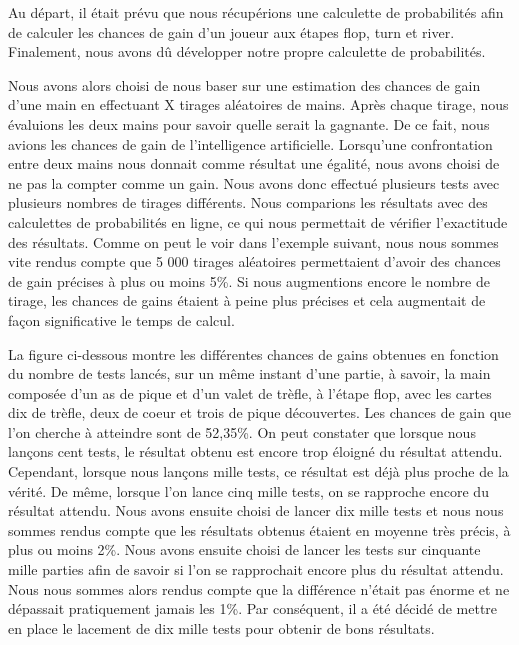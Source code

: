 \documentclass{report}
\begin{document}
Au départ, il était prévu que nous récupérions une calculette de probabilités afin de calculer les chances de gain d'un joueur aux étapes flop, turn et river. Finalement, nous avons dû développer notre propre calculette de probabilités.\par
Nous avons alors choisi de nous baser sur une estimation des chances de gain d'une main en effectuant X tirages aléatoires de mains. Après chaque tirage, nous évaluions les deux mains pour savoir quelle serait la gagnante. De ce fait, nous avions les chances de gain de l'intelligence artificielle. Lorsqu'une confrontation entre deux mains nous donnait comme résultat une égalité, nous avons choisi de ne pas la compter comme un gain.
Nous avons donc effectué plusieurs tests avec plusieurs nombres de tirages différents. Nous comparions les résultats avec des calculettes de probabilités en ligne, ce qui nous permettait de vérifier l'exactitude des résultats.
Comme on peut le voir dans l'exemple suivant, nous nous sommes vite rendus compte que 5 000 tirages aléatoires permettaient d'avoir des chances de gain précises à plus ou moins 5\%. Si nous augmentions encore le nombre de tirage, les chances de gains étaient à peine plus précises et cela augmentait de façon significative le temps de calcul. \par

La figure ci-dessous montre les différentes chances de gains obtenues en fonction du nombre de tests lancés, sur un même instant d'une partie, à savoir, la main composée d'un as de pique et d'un valet de trèfle, à l'étape flop, avec les cartes dix de trèfle, deux de coeur et trois de pique découvertes. Les chances de gain que l'on cherche à atteindre sont de 52,35\%. On peut constater que lorsque nous lançons cent tests, le résultat obtenu est encore trop éloigné du résultat attendu. Cependant, lorsque nous lançons mille tests, ce résultat est déjà plus proche de la vérité. De même, lorsque l'on lance cinq mille tests, on se rapproche encore du résultat attendu. Nous avons ensuite choisi de lancer dix mille tests et nous nous sommes rendus compte que les résultats obtenus étaient en moyenne très précis, à plus ou moins 2\%. Nous avons ensuite choisi de lancer les tests sur cinquante mille parties afin de savoir si l'on se rapprochait encore plus du résultat attendu. Nous nous sommes alors rendus compte que la différence n'était pas énorme et ne dépassait pratiquement jamais les 1\%. Par conséquent, il a été décidé de mettre en place le lacement de dix mille tests pour obtenir de bons résultats.\par
\end{document}
